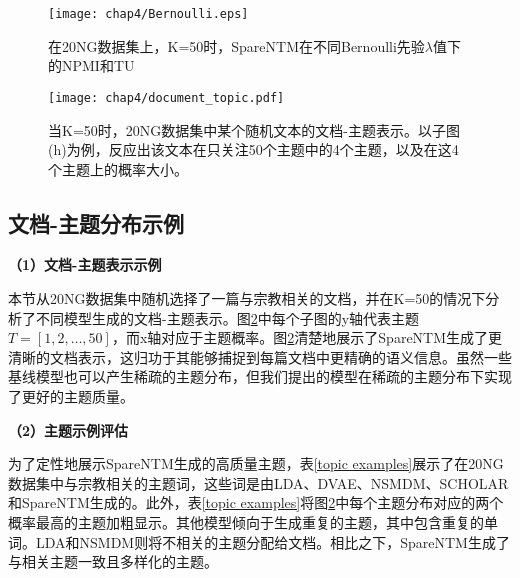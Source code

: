 \begin{figure}
    \centering
        \texttt{[image: chap4/Bernoulli.eps]}
        \caption{在20NG数据集上，K=50时，SpareNTM在不同Bernoulli先验$\lambda$值下的NPMI和TU} \label{Performance_Bern}
\end{figure}


\begin{figure}
    \centering
        \texttt{[image: chap4/document\_topic.pdf]}
        \caption{当K=50时，20NG数据集中某个随机文本的文档-主题表示。以子图(h)为例，反应出该文本在只关注50个主题中的4个主题，以及在这4个主题上的概率大小。} \label{document_topic_figure}
\end{figure}
\subsection{文档-主题分布示例}
\textbf{（1）文档-主题表示示例}

本节从20NG数据集中随机选择了一篇与宗教相关的文档，并在K=50的情况下分析了不同模型生成的文档-主题表示。图\ref{document_topic_figure}中每个子图的y轴代表主题$T=[1,2,\dots,50]$，而x轴对应于主题概率。图\ref{document_topic_figure}清楚地展示了SpareNTM生成了更清晰的文档表示，这归功于其能够捕捉到每篇文档中更精确的语义信息。虽然一些基线模型也可以产生稀疏的主题分布，但我们提出的模型在稀疏的主题分布下实现了更好的主题质量。

\textbf{（2）主题示例评估} 

为了定性地展示SpareNTM生成的高质量主题，表\ref{topic examples}展示了在20NG数据集中与宗教相关的主题词，这些词是由LDA、DVAE、NSMDM、SCHOLAR和SpareNTM生成的。此外，表\ref{topic examples}将图\ref{document_topic_figure}中每个主题分布对应的两个概率最高的主题加粗显示。其他模型倾向于生成重复的主题，其中包含重复的单词。LDA和NSMDM则将不相关的主题分配给文档。相比之下，SpareNTM生成了与相关主题一致且多样化的主题。

